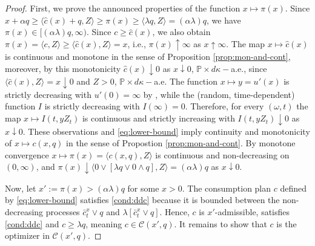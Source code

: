 \documentclass[11pt, oneside]{article}   	%
\theoremstyle{plain}
\theoremstyle{definition}
\theoremstyle{remark}
\begin{document}
\begin{proof} First, we prove the announced properties of the function $x\mapsto\pi(x)$. Since $x+\alpha q\geq\langle\hat{c}(x)+ q,Z\rangle\geq \pi(x)\geq\langle \lambda q,Z\rangle=(\alpha\lambda)q$, we have
$\pi(x)\in[(\alpha\lambda)q,\infty)$. Since $c\geq \hat{c}(x)$, we also obtain $\pi(x)=\langle c, Z\rangle\geq \langle \hat{c}(x),Z\rangle =x$, i.e., $\pi(x)\uparrow\infty$ as $x\uparrow \infty$. The map $x\mapsto\hat{c}(x)$ is continuous and monotone in the sense of Proposition \ref{prop:mon-and-cont}, moreover, by this monotonicity $\hat{c}(x)\downarrow 0$ as $x\downarrow 0$, $\mathbb{P}\times d\kappa-$a.e., since $\langle \hat{c}(x),Z\rangle=x\downarrow 0$ and $Z>0$, $\mathbb{P}\times d\kappa-$a.e. The function $x\mapsto y=u'(x)$ is strictly decreasing with $u'(0)=\infty$ by \cite[Theorem 3.2]{mostovyi}, while the (random, time-dependent) function $I$ is strictly decreasing with $I(\infty)=0$. Therefore, for every $(\omega,t)$ the map $x\mapsto I(t,yZ_t)$ is continuous and strictly increasing with $I(t,yZ_t)\downarrow 0$ as $x\downarrow 0$. These observations and \eqref{eq:lower-bound} imply continuity and monotonicity of $x\mapsto c(x,q)$ in the sense of Propostion \ref{prop:mon-and-cont}. By monotone convergence $x\mapsto \pi(x)=\langle c(x,q),Z\rangle$ is continuous and non-decreasing on $(0,\infty)$, and $\pi(x)\downarrow \langle 0\vee[\lambda q\vee 0\wedge q],Z\rangle=(\alpha\lambda)q$ as $x\downarrow 0$.

Now, let $x':=\pi(x)>(\alpha\lambda)q$ for some $x>0$. The consumption plan $c$ defined by \eqref{eq:lower-bound} satisfies \eqref{cond:ddc} because it is bounded between the non-decreasing processes $\bar{c}_t^{x}\vee q$ and $\lambda[\bar{c}_t^{x}\vee q]$. Hence, $c$ is $x'$-admissible, satisfies \eqref{cond:ddc} and $c\geq\lambda q$, meaning $c\in\mathcal{C}(x',q)$. It remains to show that $c$ is the optimizer in $\mathcal{C}(x',q)$.



\end{proof}
\end{document}
